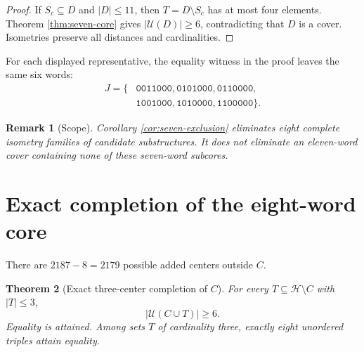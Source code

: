 \documentclass[11pt]{article}
\newtheorem{theorem}{Theorem}
\newtheorem{remark}[theorem]{Remark}
\newcommand{\Hspace}{\mathcal{H}}
\newcommand{\Uncov}{\mathcal{U}}
\newcommand{\codeword}[1]{\texttt{#1}}
\begin{document}
\begin{proof}
If \(S_c\subseteq D\) and \(|D|\leq 11\), then
\(T=D\setminus S_c\) has at most four elements.  Theorem
\ref{thm:seven-core} gives \(|\Uncov(D)|\geq 6\), contradicting that \(D\)
is a cover.  Isometries preserve all distances and cardinalities.
\end{proof}

For each displayed representative, the equality witness in the proof
leaves the same six words:
\[
\begin{split}
J=\{&
\codeword{0011000},
\codeword{0101000},
\codeword{0110000},\\
&
\codeword{1001000},
\codeword{1010000},
\codeword{1100000}
\}.
\end{split}
\]

\begin{remark}[Scope]
Corollary \ref{cor:seven-exclusion} eliminates eight complete isometry
families of candidate substructures.  It does not eliminate an eleven-word
cover containing none of these seven-word subcores.
\end{remark}

\section{Exact completion of the eight-word core}

There are \(2187-8=2179\) possible added centers outside \(C\).

\begin{theorem}[Exact three-center completion of \(C\)]
\label{thm:core}
For every \(T\subseteq\Hspace\setminus C\) with \(|T|\leq 3\),
\[
  |\Uncov(C\cup T)|\geq 6.
\]
Equality is attained.  Among sets \(T\) of cardinality three, exactly
eight unordered triples attain equality.
\end{theorem}
\end{document}
